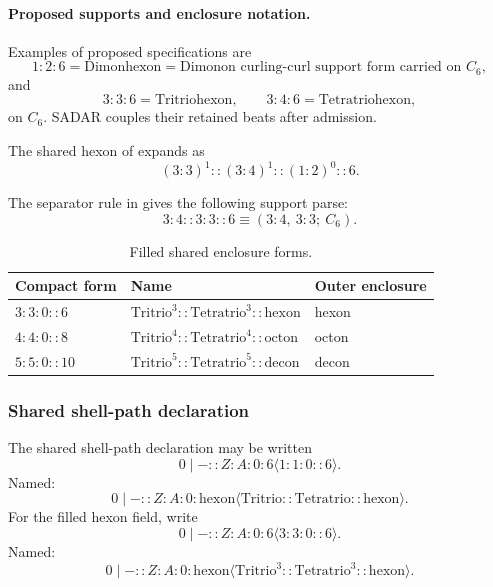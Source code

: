 

\paragraph{Proposed supports and enclosure notation.}
Examples of proposed specifications are
\[
1{:}2{:}6=\text{Dimonhexon}
=\text{Dimonon curling-curl support form carried on }C_6,
\]
and
\[
3{:}3{:}6=\text{Tritriohexon},
\qquad
3{:}4{:}6=\text{Tetratriohexon},
\]
on \(C_6\). SADAR couples their retained beats after admission.

The shared hexon of  expands as
\[
(3:3)^1::(3:4)^1::(1:2)^0::6.
\]


The separator rule in 
gives the following support parse:
\begin{equation}
3{:}4::3{:}3::6
\equiv
(3{:}4,\ 3{:}3;\ C_6).
\label{eq:double-colon-parse-example}
\end{equation}

\begin{table}[H]
\centering
\caption{Filled shared enclosure forms.}
\label{tab:cc-filled-shared-enclosures}
\renewcommand{\arraystretch}{1.15}
\begin{tabular}{@{}lll@{}}
\toprule
Compact form & Name & Outer enclosure \\
\midrule
\(3:3:0::6\) & \(\mathrm{Tritrio}^{3}::\mathrm{Tetratrio}^{3}::\mathrm{hexon}\) & hexon \\
\(4:4:0::8\) & \(\mathrm{Tritrio}^{4}::\mathrm{Tetratrio}^{4}::\mathrm{octon}\) & octon \\
\(5:5:0::10\) & \(\mathrm{Tritrio}^{5}::\mathrm{Tetratrio}^{5}::\mathrm{decon}\) & decon \\
\bottomrule
\end{tabular}
\end{table}

\subsubsection{Shared shell-path declaration}\label{subsec:shared-shell-path-declaration}
The shared shell-path declaration may be written
\[
0\mid-::Z:A:0:6\langle 1:1:0::6\rangle.
\]
Named:
\[
0\mid-::Z:A:0:\mathrm{hexon}\langle \mathrm{Tritrio}::\mathrm{Tetratrio}::\mathrm{hexon}\rangle.
\]
For the filled hexon field, write
\[
0\mid-::Z:A:0:6\langle 3:3:0::6\rangle.
\]
Named:
\[
0\mid-::Z:A:0:\mathrm{hexon}\langle \mathrm{Tritrio}^{3}::\mathrm{Tetratrio}^{3}::\mathrm{hexon}\rangle.
\]

